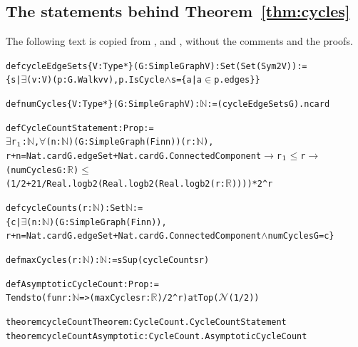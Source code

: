 \subsection{The statements behind Theorem~\ref{thm:cycles}}

The following text is copied from ,
 and , without the comments and the proofs.

{\small
\begin{alltt}
def cycleEdgeSets \{V : Type*\} (G : SimpleGraph V) : Set (Set (Sym2 V)) :=
  \{s | \(\exists\) (v : V) (p : G.Walk v v), p.IsCycle \(\land\) s = \{a | a \(\in\) p.edges\}\}

def numCycles \{V : Type*\} (G : SimpleGraph V) : \(\mathbb{N}\) := (cycleEdgeSets G).ncard

def CycleCountStatement : Prop :=
  \(\exists\) r\(\sb{1}\) : \(\mathbb{N}\), \(\forall\) (n : \(\mathbb{N}\)) (G : SimpleGraph (Fin n)) (r : \(\mathbb{N}\)),
    r + n = Nat.card G.edgeSet + Nat.card G.ConnectedComponent \(\to\) r\(\sb{1}\) \(\le\) r \(\to\)
    (numCycles G : \(\mathbb{R}\)) \(\le\)
      (1 / 2 + 21 / Real.logb 2 (Real.logb 2 (Real.logb 2 (r : \(\mathbb{R}\))))) * 2 ^ r

def cycleCounts (r : \(\mathbb{N}\)) : Set \(\mathbb{N}\) :=
  \{c | \(\exists\) (n : \(\mathbb{N}\)) (G : SimpleGraph (Fin n)),
    r + n = Nat.card G.edgeSet + Nat.card G.ConnectedComponent \(\land\) numCycles G = c\}

def maxCycles (r : \(\mathbb{N}\)) : \(\mathbb{N}\) := sSup (cycleCounts r)

def AsymptoticCycleCount : Prop :=
  Tendsto (fun r : \(\mathbb{N}\) => (maxCycles r : \(\mathbb{R}\)) / 2 ^ r) atTop (\(\mathcal{N}\) (1 / 2))

theorem cycleCountTheorem : CycleCount.CycleCountStatement
theorem cycleCountAsymptotic : CycleCount.AsymptoticCycleCount
\end{alltt}}


